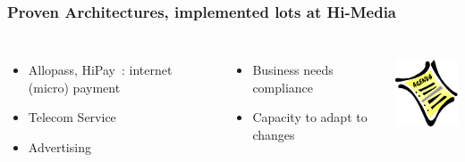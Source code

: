 \documentclass[english]{beamer}
\begin{document}
\begin{frame}[fragile]
  \frametitle{Proven Architectures, implemented lots at Hi-Media}


\begin{columns}[c]


  \begin{itemize}
   \item<2-> Allopass, HiPay : internet (micro) payment
   \item<2-> Telecom Service
   \item<2-> Advertising
  \end{itemize}  


  \begin{itemize}
  \item<4-> Business needs compliance
  \item<4-> Capacity to adapt to changes
  \end{itemize}  

\begin{center}
  \includegraphics[height=7em]{agenda.jpg}
\end{center}
\end{columns}
\end{frame}
\end{document}
